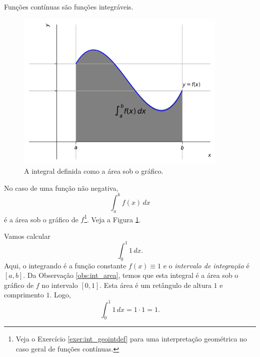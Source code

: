 \begin{obs}
  Funções contínuas são funções integráveis.
\end{obs}

\begin{figure}[H]
  \centering
  \includegraphics[width=0.9\textwidth]{./cap_int/dados/fig_geointdef/fig_geointdef}
  \caption{A integral definida como a área sob o gráfico.}
  \label{fig:geointdef}
\end{figure}

\begin{obs}\label{obs:int_area}
  No caso de uma função não negativa,
  \begin{equation}
    \int_a^b f(x)\,dx
  \end{equation}
  é a área sob o gráfico de $f$\footnote{Veja o Exercício \ref{exer:int_geointdef} para uma interpretação geométrica no caso geral de funções contínuas.}. Veja a Figura \ref{fig:geointdef}.  
\end{obs}

\begin{ex}
  Vamos calcular
  \begin{equation}
    \int_0^1 1\,dx.
  \end{equation}
  Aqui, o integrando é a função constante $f(x) \equiv 1$ e o \emph{intervalo de integração} é $[a, b]$. Da Observação \ref{obs:int_area}, temos que esta integral é a área sob o gráfico de $f$ no intervalo $[0, 1]$. Esta área é um retângulo de altura $1$ e comprimento $1$. Logo,
  \begin{equation}
    \int_0^1 1\,dx = 1\cdot 1 = 1.
  \end{equation}
\end{ex}

